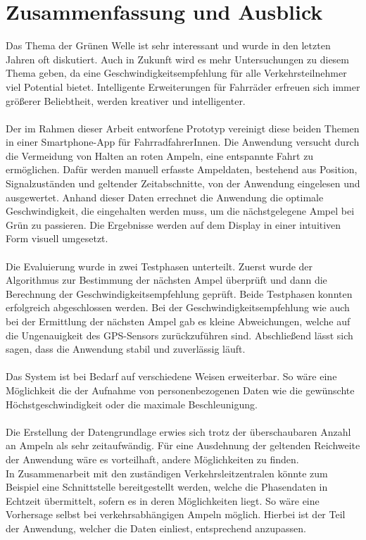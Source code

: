 \chapter{\label{chap:fazit}Zusammenfassung und Ausblick}
Das Thema der Grünen Welle ist sehr interessant und wurde in den letzten Jahren oft diskutiert. Auch in Zukunft wird es mehr Untersuchungen zu diesem Thema geben, da eine Geschwindigkeitsempfehlung für alle Verkehrsteilnehmer viel Potential bietet. Intelligente Erweiterungen für Fahrräder erfreuen sich immer größerer Beliebtheit, werden kreativer und intelligenter.\\\\
Der im Rahmen dieser Arbeit entworfene Prototyp vereinigt diese beiden Themen in einer \gls{Smartphone}-\gls{App} für FahrradfahrerInnen. Die Anwendung versucht durch die Vermeidung von Halten an roten Ampeln, eine entspannte Fahrt zu ermöglichen. Dafür werden manuell erfasste Ampeldaten, bestehend aus Position, Signalzuständen und geltender Zeitabschnitte, von der Anwendung eingelesen und ausgewertet. Anhand dieser Daten errechnet die Anwendung die optimale Geschwindigkeit, die eingehalten werden muss, um die nächstgelegene Ampel bei Grün zu passieren. Die Ergebnisse werden auf dem Display in einer intuitiven Form visuell umgesetzt.\\\\ 
Die Evaluierung wurde in zwei Testphasen unterteilt. Zuerst wurde der Algorithmus zur Bestimmung der nächsten Ampel überprüft und dann die Berechnung der Geschwindigkeitsempfehlung geprüft. Beide Testphasen konnten erfolgreich abgeschlossen werden. Bei der Geschwindigkeitsempfehlung wie auch bei der Ermittlung der nächsten Ampel gab es kleine Abweichungen, welche auf die Ungenauigkeit des \gls{GPS}-Sensors zurückzuführen sind. Abschließend lässt sich sagen, dass die Anwendung stabil und zuverlässig läuft.\\\\
%
%
Das System ist bei Bedarf auf verschiedene Weisen erweiterbar. So wäre eine Möglichkeit die der Aufnahme von personenbezogenen Daten wie die gewünschte Höchstgeschwindigkeit oder die maximale Beschleunigung.\\\\
Die Erstellung der Datengrundlage erwies sich trotz der überschaubaren Anzahl an Ampeln als sehr zeitaufwändig. Für eine Ausdehnung der geltenden Reichweite der Anwendung wäre es vorteilhaft, andere Möglichkeiten zu finden.\\ 
In Zusammenarbeit mit den zuständigen Verkehrsleitzentralen könnte zum Beispiel eine Schnittstelle bereitgestellt werden, welche die Phasendaten in Echtzeit übermittelt, sofern es in deren Möglichkeiten liegt. So wäre eine Vorhersage selbst bei verkehrsabhängigen Ampeln möglich. Hierbei ist der Teil der Anwendung, welcher die Daten einliest, entsprechend anzupassen.\\
